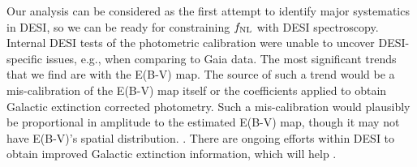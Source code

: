 Our analysis can be considered as the first attempt to identify major systematics in DESI, so we can be ready for constraining $f_{\rm NL}$ with DESI spectroscopy. Internal DESI tests of the photometric calibration were unable to uncover DESI-specific issues, e.g., when comparing to Gaia data. The most significant trends that we find are with the E(B-V) map. The source of such a trend would be a mis-calibration of the E(B-V) map itself or the coefficients applied to obtain Galactic extinction corrected photometry. Such a mis-calibration would plausibly be proportional in amplitude to the estimated E(B-V) map, though it may not have E(B-V)’s spatial distribution. . There are ongoing efforts within DESI to obtain improved Galactic extinction information, which will help .  
